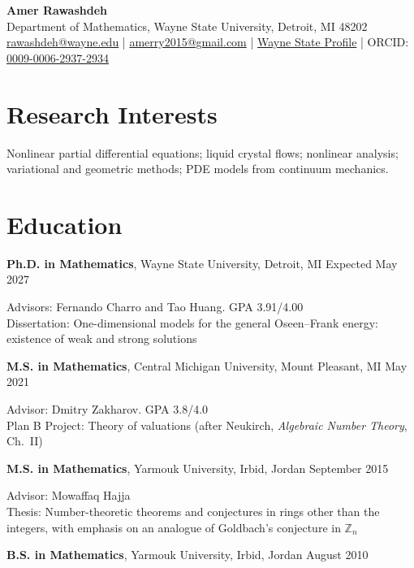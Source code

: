 \documentclass[11pt]{article}
\newcommand{\entry}[2]{\noindent #1 \hfill #2\par}
\begin{document}
\begin{center}
  {\LARGE\bfseries Amer Rawashdeh}\\[0.6ex]
  Department of Mathematics, Wayne State University, Detroit, MI 48202\\
  \href{mailto:rawashdeh@wayne.edu}{rawashdeh@wayne.edu} \;|\;
    \href{mailto:amerry2015@gmail.com}{amerry2015@gmail.com} \;|\;
  \href{https://clasprofiles.wayne.edu/profile/hf1056}{Wayne State Profile} \;|\;
  ORCID: \href{https://orcid.org/0009-0006-2937-2934}{0009-0006-2937-2934}
\end{center}

\section{Research Interests}
Nonlinear partial differential equations; liquid crystal flows; nonlinear analysis;
variational and geometric methods; PDE models from continuum mechanics.

\section{Education}
\entry{\textbf{Ph.D. in Mathematics}, Wayne State University, Detroit, MI}{Expected May 2027}
\hspace*{1.2em}Advisors: Fernando Charro and Tao Huang. GPA 3.91/4.00\\
\hspace*{1.2em}Dissertation: One-dimensional models for the general Oseen--Frank energy:
existence of weak and strong solutions

\medskip
\entry{\textbf{M.S. in Mathematics}, Central Michigan University, Mount Pleasant, MI}{May 2021}
\hspace*{1.2em}Advisor: Dmitry Zakharov. GPA 3.8/4.0\\
\hspace*{1.2em}Plan B Project: Theory of valuations (after Neukirch, \emph{Algebraic Number Theory}, Ch.~II)

\medskip
\entry{\textbf{M.S. in Mathematics}, Yarmouk University, Irbid, Jordan}{September 2015}
\hspace*{1.2em}Advisor: Mowaffaq Hajja\\
\hspace*{1.2em}Thesis: Number-theoretic theorems and conjectures in rings other than the integers,
with emphasis on an analogue of Goldbach's conjecture in $\mathbb{Z}_n$

\medskip
\entry{\textbf{B.S. in Mathematics}, Yarmouk University, Irbid, Jordan}{August 2010}
\end{document}
